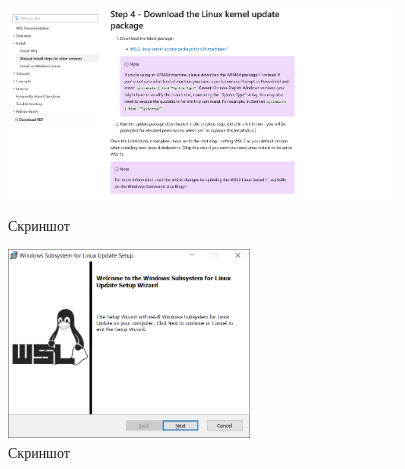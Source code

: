 \begin{figure}[!phtb]
    \centering

    \begin{minipage}{0.49\textwidth}
        \centering

        \includegraphics[height=5cm]
        {images/install/docker/7.png}

        \caption{Скриншот}

        \label{fig:docker_7}
    \end{minipage}
    \begin{minipage}{0.49\textwidth}
        \centering

        \includegraphics[height=5cm]
        {images/install/docker/8.png}

        \caption{Скриншот}

        \label{fig:docker_8}
    \end{minipage}
\end{figure}

